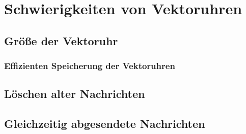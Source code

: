 \section{Schwierigkeiten von Vektoruhren}
\subsection{Größe der Vektoruhr}
\subsubsection{Effizienten Speicherung der Vektoruhren}
\subsection{Löschen alter Nachrichten}
\subsection{Gleichzeitig abgesendete Nachrichten}
